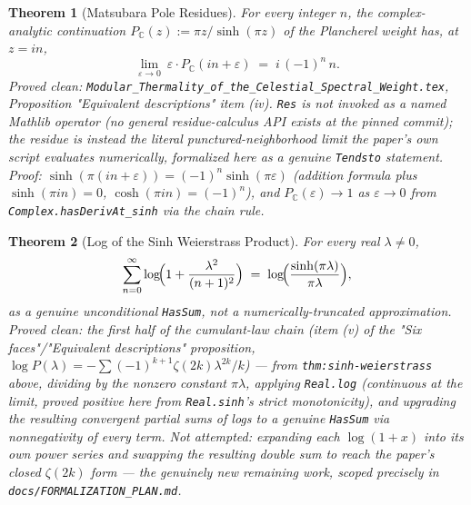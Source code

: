 \documentclass{report}
\newtheorem{theorem}{Theorem}[chapter]
\theoremstyle{definition}
\begin{document}
\begin{theorem}[Matsubara Pole Residues]
  \label{thm:matsubara-poles}
  \leanok
  For every integer $n$, the complex-analytic continuation
  $P_{\mathbb C}(z) := \pi z/\sinh(\pi z)$ of the Plancherel weight has, at $z = in$,
  \[
    \lim_{\varepsilon\to0}\ \varepsilon\cdot P_{\mathbb C}(in+\varepsilon)
    \;=\; i\,(-1)^n\,n .
  \]
  \emph{Proved clean}: \texttt{Modular\_Thermality\_of\_the\_Celestial\_Spectral\_Weight.tex},
  Proposition "Equivalent descriptions" item (iv). \texttt{Res} is not invoked as a named
  Mathlib operator (no general residue-calculus API exists at the pinned commit); the
  residue is instead the literal punctured-neighborhood limit the paper's own script
  evaluates numerically, formalized here as a genuine \texttt{Tendsto} statement. Proof:
  $\sinh(\pi(in+\varepsilon)) = (-1)^n\sinh(\pi\varepsilon)$ (addition formula plus
  $\sinh(\pi in)=0$, $\cosh(\pi in)=(-1)^n$), and $P_{\mathbb C}(\varepsilon)\to1$ as
  $\varepsilon\to0$ from \texttt{Complex.hasDerivAt\_sinh} via the chain rule.
\end{theorem}

\begin{theorem}[Log of the Sinh Weierstrass Product]
  \label{thm:sinh-log-series}
  \leanok
  For every real $\lambda \neq 0$,
  \[
    \sum_{n=0}^{\infty} \log\!\Bigl(1+\frac{\lambda^2}{(n+1)^2}\Bigr)
    \;=\; \log\!\Bigl(\frac{\sinh(\pi\lambda)}{\pi\lambda}\Bigr),
  \]
  as a genuine unconditional \texttt{HasSum}, not a numerically-truncated approximation.
  \emph{Proved clean}: the first half of the cumulant-law chain (item (v) of the "Six
  faces"/"Equivalent descriptions" proposition, $\log P(\lambda) = -\sum(-1)^{k+1}\zeta(2k)
  \lambda^{2k}/k$) --- from \texttt{thm:sinh-weierstrass} above, dividing by the nonzero
  constant $\pi\lambda$, applying \texttt{Real.log} (continuous at the limit, proved
  positive here from \texttt{Real.sinh}'s strict monotonicity), and upgrading the resulting
  convergent partial sums of logs to a genuine \texttt{HasSum} via nonnegativity of every
  term. \emph{Not attempted}: expanding each $\log(1+x)$ into its own power series and
  swapping the resulting double sum to reach the paper's closed $\zeta(2k)$ form --- the
  genuinely new remaining work, scoped precisely in \texttt{docs/FORMALIZATION\_PLAN.md}.
\end{theorem}
\end{document}
